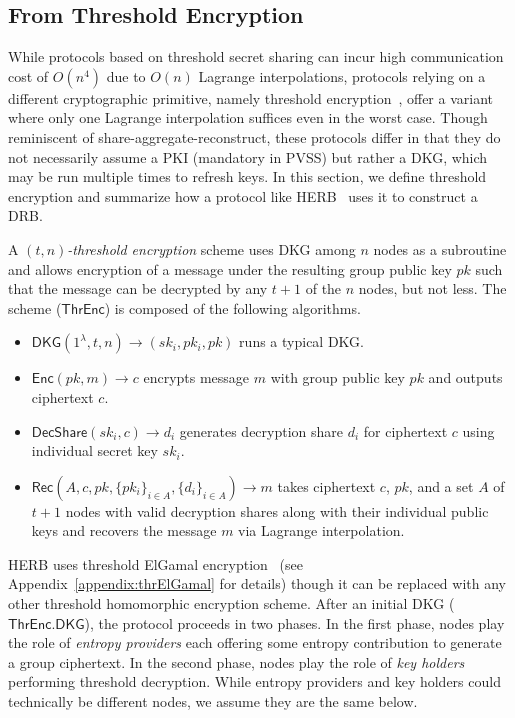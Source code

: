 \subsection{From Threshold Encryption}
While protocols based on threshold secret sharing can incur high communication cost of $O(n^4)$ due to $O(n)$ Lagrange interpolations, protocols relying on a different cryptographic primitive, namely threshold encryption~\cite{desmedt1990Threshold}, offer a variant where only one Lagrange interpolation suffices even in the worst case. Though reminiscent of share-aggregate-reconstruct, these protocols differ in that they do not necessarily assume a PKI (mandatory in PVSS) but rather a DKG, which may be run multiple times to refresh keys. In this section, we define threshold encryption and summarize how a protocol like HERB~\cite{cherniaeva2019homomorphic} uses it to construct a DRB.

\begin{definition}
A \textit{$(t, n)$-threshold encryption} scheme uses DKG among $n$ nodes as a subroutine and allows encryption of a message under the resulting group public key $pk$ such that the message can be decrypted by any $t + 1$ of the $n$ nodes, but not less. The scheme ($\mathsf{ThrEnc}$) is composed of the following algorithms.
\begin{itemize}
    \item $\mathsf{DKG}(1^\lambda, t, n) \rightarrow (sk_i, pk_i, pk)$ runs a typical DKG.
    \item $\mathsf{Enc}(pk, m) \rightarrow c$ encrypts message $m$ with group public key $pk$ and outputs ciphertext $c$.
    \item $\mathsf{DecShare}(sk_i, c) \rightarrow d_i$ generates decryption share $d_i$ for ciphertext $c$ using individual secret key $sk_i$.
    \item $\mathsf{Rec}(A, c, pk, \{pk_i\}_{i \in A}, \{d_i\}_{i \in A}) \rightarrow m$ takes ciphertext $c$, $pk$, and a set $A$ of $t + 1$ nodes with valid decryption shares along with their individual public keys and recovers the message $m$ via Lagrange interpolation.
\end{itemize}
\end{definition}

HERB uses threshold ElGamal encryption~\cite{desmedt1990Threshold, fouque2001threshold} (see Appendix~\ref{appendix:thrElGamal} for details) though it can be replaced with any other threshold homomorphic encryption scheme. After an initial DKG ($\mathsf{ThrEnc.DKG}$), the protocol proceeds in two phases. In the first phase, nodes play the role of \textit{entropy providers} each offering some entropy contribution to generate a group ciphertext. In the second phase, nodes play the role of \textit{key holders} performing threshold decryption. While entropy providers and key holders could technically be different nodes, we assume they are the same below.

